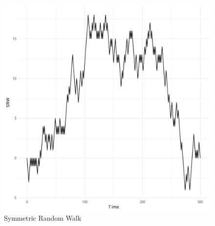 \documentclass{article}\usepackage[]{graphicx}\usepackage[]{color}
\makeatletter
\def\maxwidth{ %
  \ifdim\Gin@nat@width>\linewidth
    \linewidth
  \else
    \Gin@nat@width
  \fi
}
\newenvironment{knitrout}{}{} %
\makeatother
\begin{document}
\begin{figure}[!h]
\begin{center}

\begin{knitrout}
\color{fgcolor}
\includegraphics[width=\maxwidth]{figure/unnamed-chunk-3-1} 

\end{knitrout}


\end{center}
\caption{Symmetric Random Walk}
\end{figure}
\end{document}
